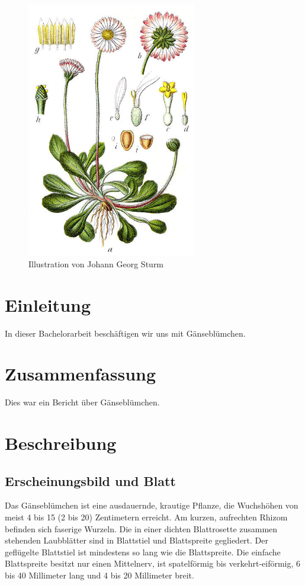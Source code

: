 \documentclass[11pt]{article}
\begin{document}
	\begin{figure}[H]
	    \centering
        \includegraphics[width=0.66\textwidth, angle=30]{2.jpg}
    	\caption{Illustration von Johann Georg Sturm}
	    \label{fig2}
    \end{figure}
	
	\section{Einleitung}
	In dieser Bachelorarbeit beschäftigen wir uns mit Gänseblümchen.  
	    
	
	\section{Zusammenfassung}
	Dies war ein Bericht über Gänseblümchen. 
	
	\section{Beschreibung}
	\subsection{Erscheinungsbild und Blatt}
	Das Gänseblümchen ist eine ausdauernde, krautige Pflanze, die Wuchshöhen von meist 4 bis 15 (2 bis 20)\cite{2} Zentimetern erreicht. Am kurzen, aufrechten Rhizom befinden sich faserige Wurzeln.\cite{3}
    Die in einer dichten Blattrosette zusammen stehenden Laubblätter sind in Blattstiel und Blattspreite gegliedert. Der geflügelte Blattstiel ist mindestens so lang wie die Blattspreite.\cite{3} Die einfache Blattspreite besitzt nur einen Mittelnerv, ist spatelförmig bis verkehrt-eiförmig,\cite{2} 6 bis 40 Millimeter lang und 4 bis 20 Millimeter breit.\cite{3}
\end{document}
